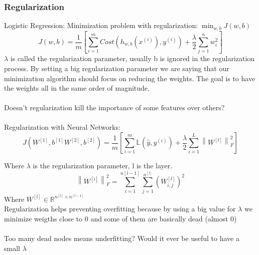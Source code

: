 \documentclass{article}
\newcommand{\norm}[1]{\left\lVert#1\right\rVert}
\begin{document}
\subsubsection*{Regularization}
Logistic Regression: Minimization problem with regularization:$ \;\min_{w,b}{J(w,b)}$
$$J(w,b)= \frac{1}{m}\left[ \sum_{i=1}^{m}{Cost(h_{w,b}(x^{(i)}), y^{(i)})+\frac{\lambda}{2}\sum_{j=1}^{n}{w_i^2}} \right]$$
$\lambda$ is called the regularization parameter, usually b is ignored in the regularization process.
By setting a big regularization parameter we are saying that our minimization algorithm should focus on reducing the weights. The goal is to have the weights all in the same order of magnitude.\\\\
Doesn't regularization kill the importance of some features over others?\\\\
Regularization with Neural Networks:\\
$$J(W^{[1]}, b^{[1]}W^{[2]}, b^{[2]})= \frac{1}{m}\left[ \sum_{i=1}^{m}{\mathbb{L}(\hat{y}, y^{(i)})+\frac{\lambda}{2}\sum_{i=1}^{L}{\norm{W^{[l]}}^2_F}} \right]$$

Where $\lambda$ is the regularization parameter, l is the layer. $$\norm{W^{[i]}}^2_F=\sum_{i=1}^{n{[l-1]}}{\sum_{j=1}^{n^{[l]}}{(W_{i,j}^{[l]})^2}}$$
Where $W^{[l]}\in \mathbb{R}^{n^{[l]}\times n^{[l-1]}}$\\
Regularization helps preventing overfitting because by using a big value for $\lambda$ we minimize weigths close to 0 and some of them are basically dead (almost 0)\\\\
Too many dead nodes means underfitting? Would it ever be useful to have a small $\lambda$\\\\
\end{document}
